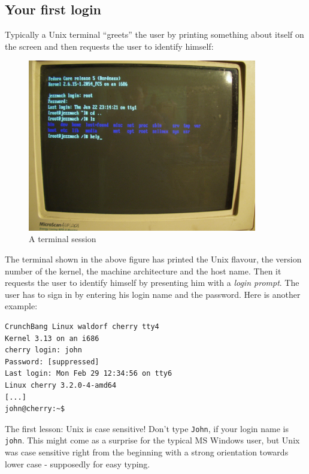 \documentclass[11pt,a4paper,twoside]{article}
\begin{document}
\subsection{Your first login}

Typically a Unix terminal ``greets'' the user by printing something about 
itself on the screen and then requests the user to identify himself:

\begin{figure}[htb]
  \begin{center}
    \includegraphics[width=10cm]{images/fedora_console}
    \caption{A terminal session}
  \end{center}
\end{figure}

The terminal shown in the above figure has printed the Unix flavour, the 
version number of the kernel, the machine architecture and the host name. 
Then it requests the user to identify himself by presenting him with a 
\emph{login prompt}. The user has to sign in by entering his login name 
and the password. Here is another example:

\begin{lstlisting}[frame=single]
CrunchBang Linux waldorf cherry tty4
Kernel 3.13 on an i686
cherry login: john
Password: [suppressed]
Last login: Mon Feb 29 12:34:56 on tty6
Linux cherry 3.2.0-4-amd64 
[...]
john@cherry:~$
\end{lstlisting}

The first lesson: Unix is case sensitive! Don't type \texttt{John}, if 
your login name is \texttt{john}. This might come as a surprise for the 
typical MS Windows user, but Unix was case sensitive right from the beginning 
with a strong orientation towards lower case - supposedly for easy typing.
\end{document}
